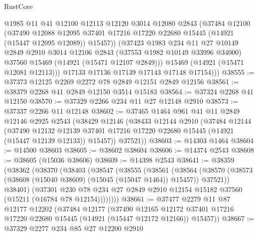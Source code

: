 \begin{lexlean}{RustCore}
\begin{coremodule}
            @1985
            @11
            @41
            @12100
            @12113
            @12120
            @3014
            @12080
            @2843
            (@37484
              @12100
              (@37490
                @12088
                @12095
                @37401
                @17216
                @17220
                @22680
                @15445
                (@14921 (@15447 @12095 @12089))
                @15457))
            (@37423
              @1983
              @234
              @11
              @27
              @10149
              @2849
              @2910
              @3014
              @12106
              @2843
              (@37553 @1982 @10149 @33996 @34000)
              @37560
              @15469
              (@14921 (@15471 @12107 @2849)))
            @15469
            (@14921 (@15471 @12081 @12113)))
          @17133
          @17136
          @17139
          @17143
          @17148
          @17154)))
@38555 := @37373 @12125 @2269 @2272 @78 @2849 @12151 @2849 @12156
@38561 := @38379 @2268 @41 @2849 @12150 @3514 @15183
@38564 := @37324 @2268 @41 @12150
@38570 := @37329 @2266 @234 @11 @27 @12148 @2910
@38573 := @37337 @2266 @11 @12148
@38602 := @37465
    @1464
    @961
    @41
    @11
    @2849
    @12146
    @2925
    @2543
    (@38429
      @12146
      (@38433
        @12144
        @2910
        (@37484
          @12144
          (@37490
            @12132
            @12139
            @37401
            @17216
            @17220
            @22680
            @15445
            (@14921 (@15447 @12139 @12133))
            @15457))
        @37521))
@38603 := @14303 @1464
@38604 := @14500 @38603
@38605 := @38602 @38604
@38606 := @14374 @2543
@38608 := @38605 (@15036 @38606)
@38609 := @14398 @2543
@38641 := @38359
    (@38362
      (@38370
        (@38403
          (@38547
            (@38555
              (@38561
                (@38564
                  (@38570 (@38573 (@38608 (@15040 @38609) (@15045 (@15047 @1464)) @15457)) @37521))
                @38401)
              (@37301
                @230
                @78
                @234
                @27
                @2849
                @2910
                @12154
                @15182
                @37560
                (@15211 (@16784 @78 @12154))))))))
@38661 := @37477
    @2279
    @11
    @87
    @12177
    @12202
    (@37484
      @12177
      (@37490
        @12165
        @12172
        @37401
        @17216
        @17220
        @22680
        @15445
        (@14921 (@15447 @12172 @12166))
        @15457))
@38667 := @37329 @2277 @234 @85 @27 @12200 @2910

\end{coremodule}
\end{lexlean}
